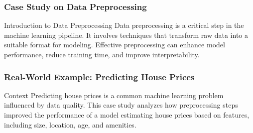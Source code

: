 \documentclass[aspectratio=169]{beamer}
\begin{document}
\begin{frame}[fragile]
    \frametitle{Case Study on Data Preprocessing}
    \begin{block}{Introduction to Data Preprocessing}
        Data preprocessing is a critical step in the machine learning pipeline. It involves techniques that transform raw data into a suitable format for modeling. Effective preprocessing can enhance model performance, reduce training time, and improve interpretability.
    \end{block}
\end{frame}

\begin{frame}[fragile]
    \frametitle{Real-World Example: Predicting House Prices}
    \begin{block}{Context}
        Predicting house prices is a common machine learning problem influenced by data quality. This case study analyzes how preprocessing steps improved the performance of a model estimating house prices based on features, including size, location, age, and amenities.
    \end{block}
\end{frame}
\end{document}
